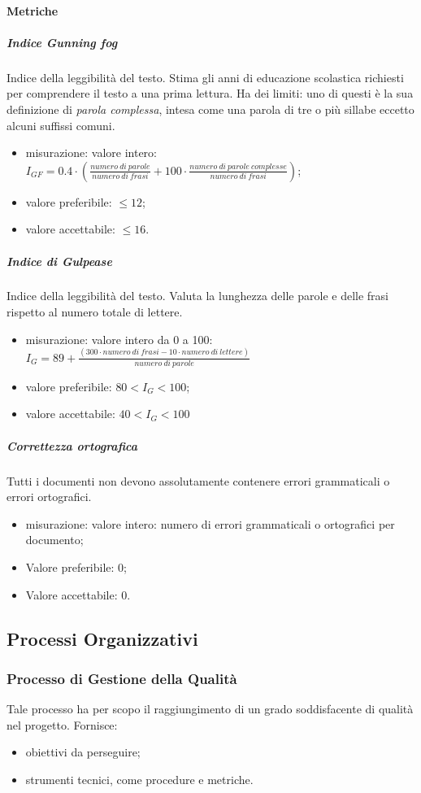 		\paragraph{Metriche}
			\subparagraph{Indice Gunning fog}
			Indice della leggibilità del testo. Stima gli anni di educazione scolastica richiesti per comprendere il testo a una prima lettura.\newline
			Ha dei limiti: uno di questi è la sua definizione di \textit{parola complessa}, intesa come una parola di tre o più sillabe eccetto alcuni suffissi comuni.
			\begin{itemize}
				\item misurazione: valore intero: $ I_{GF} = 0.4 \cdot
				(
				\frac{numero\ di\ parole}{numero\ di\  frasi}
				+ 100 \cdot
				\frac{numero\ di\ parole\ complesse}{numero\ di\  frasi}
				) $;
				\item valore preferibile: $ \leq 12$;
				\item valore accettabile: $ \leq 16$.
			\end{itemize}
			\subparagraph{Indice di Gulpease}
			Indice della leggibilità del testo. Valuta la lunghezza delle parole e delle frasi rispetto al numero totale di lettere. 
			\begin{itemize}
				\item misurazione: valore intero da 0 a 100:\newline 	
				$I_G = 89+ \frac{(300 \cdot numero\ di\ frasi - 10 \cdot numero\ di\ lettere)}{numero\ di\ parole}$	
				\item valore preferibile: $80 < I_G < 100$;
				\item valore accettabile: $40 < I_G < 100$	
			\end{itemize}
			\subparagraph{Correttezza ortografica}
			Tutti i documenti non devono assolutamente contenere errori grammaticali o errori ortografici. 
			\begin{itemize}
				\item misurazione: valore intero: numero di errori grammaticali o ortografici per documento;
				\item Valore preferibile: 0;
				\item Valore accettabile: 0.
			\end{itemize}
			
\subsection{Processi Organizzativi}
	\subsubsection{Processo di Gestione della Qualità}
	Tale processo ha per scopo il raggiungimento di un grado soddisfacente di qualità nel progetto. Fornisce:
	\begin{itemize}
		\item obiettivi da perseguire;
		\item strumenti tecnici, come procedure e metriche.
	\end{itemize}

